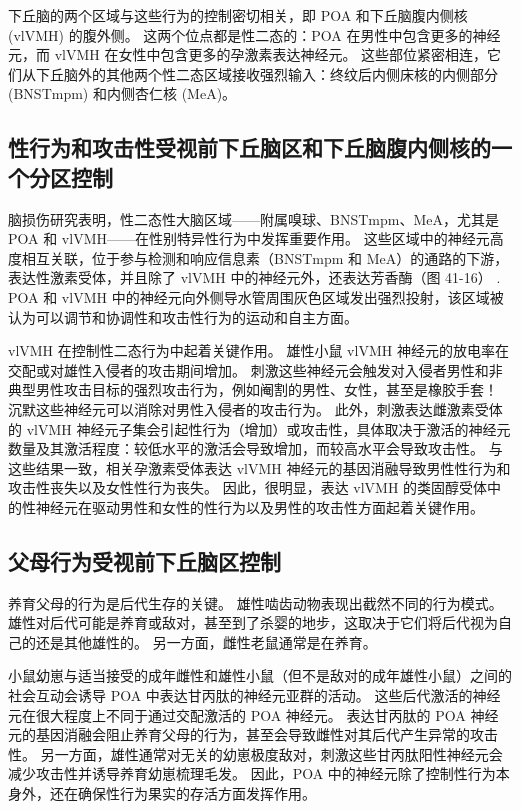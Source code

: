 下丘脑的两个区域与这些行为的控制密切相关，即 POA 和下丘脑腹内侧核 (vlVMH) 的腹外侧。 这两个位点都是性二态的：POA 在男性中包含更多的神经元，而 vlVMH 在女性中包含更多的孕激素表达神经元。 这些部位紧密相连，它们从下丘脑外的其他两个性二态区域接收强烈输入：终纹后内侧床核的内侧部分 (BNSTmpm) 和内侧杏仁核 (MeA)。

\subsection{性行为和攻击性受视前下丘脑区和下丘脑腹内侧核的一个分区控制}
脑损伤研究表明，性二态性大脑区域——附属嗅球、BNSTmpm、MeA，尤其是 POA 和 vlVMH——在性别特异性行为中发挥重要作用。 这些区域中的神经元高度相互关联，位于参与检测和响应信息素（BNSTmpm 和 MeA）的通路的下游，表达性激素受体，并且除了 vlVMH 中的神经元外，还表达芳香酶（图 41-16） . POA 和 vlVMH 中的神经元向外侧导水管周围灰色区域发出强烈投射，该区域被认为可以调节和协调性和攻击性行为的运动和自主方面。

vlVMH 在控制性二态行为中起着关键作用。 雄性小鼠 vlVMH 神经元的放电率在交配或对雄性入侵者的攻击期间增加。 刺激这些神经元会触发对入侵者男性和非典型男性攻击目标的强烈攻击行为，例如阉割的男性、女性，甚至是橡胶手套！ 沉默这些神经元可以消除对男性入侵者的攻击行为。 此外，刺激表达雌激素受体的 vlVMH 神经元子集会引起性行为（增加）或攻击性，具体取决于激活的神经元数量及其激活程度：较低水平的激活会导致增加，而较高水平会导致攻击性。 与这些结果一致，相关孕激素受体表达 vlVMH 神经元的基因消融导致男性性行为和攻击性丧失以及女性性行为丧失。 因此，很明显，表达 vlVMH 的类固醇受体中的性神经元在驱动男性和女性的性行为以及男性的攻击性方面起着关键作用。

\subsection{父母行为受视前下丘脑区控制}

养育父母的行为是后代生存的关键。 雄性啮齿动物表现出截然不同的行为模式。 雄性对后代可能是养育或敌对，甚至到了杀婴的地步，这取决于它们将后代视为自己的还是其他雄性的。 另一方面，雌性老鼠通常是在养育。

小鼠幼崽与适当接受的成年雌性和雄性小鼠（但不是敌对的成年雄性小鼠）之间的社会互动会诱导 POA 中表达甘丙肽的神经元亚群的活动。 这些后代激活的神经元在很大程度上不同于通过交配激活的 POA 神经元。 表达甘丙肽的 POA 神经元的基因消融会阻止养育父母的行为，甚至会导致雌性对其后代产生异常的攻击性。 另一方面，雄性通常对无关的幼崽极度敌对，刺激这些甘丙肽阳性神经元会减少攻击性并诱导养育幼崽梳理毛发。 因此，POA 中的神经元除了控制性行为本身外，还在确保性行为果实的存活方面发挥作用。

